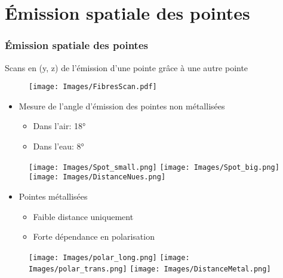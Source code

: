 \documentclass[9pt,a9paper,handout]{beamer}
\begin{document}
\section{Émission spatiale des pointes}
\begin{frame}
    \frametitle{Émission spatiale des pointes}
    Scans en (y, z) de l'émission d'une pointe grâce à une autre pointe
    \begin{figure}[c]\centering
        \texttt{[image: Images/FibresScan.pdf]}
    \end{figure}
    \vspace*{3mm}
    \begin{itemize}
        \item Mesure de l'angle d'émission des pointes non métallisées
        \begin{itemize}
            \item Dans l'air: 18\si{\degree}
            \item Dans l'eau: 8\si{\degree}
        \end{itemize}
    \end{itemize}
    \vspace*{-8mm}
    \begin{figure}[c]\centering\hspace*{35mm}
        \texttt{[image: Images/Spot\_small.png]}
        \quad
        \texttt{[image: Images/Spot\_big.png]}
        \quad
        \texttt{[image: Images/DistanceNues.png]}
    \end{figure}
\vspace*{3mm}    
    \begin{itemize}
        \item Pointes métallisées
        \begin{itemize}
            \item Faible distance uniquement
            \item Forte dépendance en polarisation
        \end{itemize}
    \end{itemize}
\vspace*{-3mm}    
    \begin{figure}[c]\centering\hspace*{35mm}
        \texttt{[image: Images/polar\_long.png]}
        \quad
        \texttt{[image: Images/polar\_trans.png]}
        \quad
        \texttt{[image: Images/DistanceMetal.png]}
    \end{figure}

\end{frame}
\end{document}
